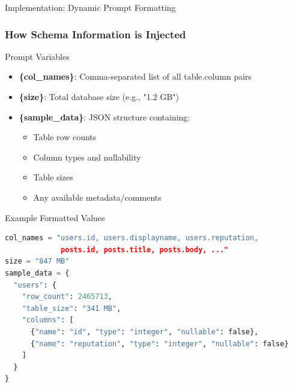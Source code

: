 \documentclass{beamer}
\begin{document}
\begin{frame}[fragile]{Implementation: Dynamic Prompt Formatting}
\frametitle{How Schema Information is Injected}

\begin{block}{Prompt Variables}
\begin{itemize}
    \item \textbf{\{col\_names\}}: Comma-separated list of all table.column pairs
    \item \textbf{\{size\}}: Total database size (e.g., "1.2 GB")
    \item \textbf{\{sample\_data\}}: JSON structure containing:
    \begin{itemize}
        \item Table row counts
        \item Column types and nullability
        \item Table sizes
        \item Any available metadata/comments
    \end{itemize}
\end{itemize}
\end{block}

\begin{exampleblock}{Example Formatted Values}
\begin{lstlisting}[language=Python, basicstyle=\tiny\ttfamily]
col_names = "users.id, users.displayname, users.reputation, 
             posts.id, posts.title, posts.body, ..."
size = "847 MB"
sample_data = {
  "users": {
    "row_count": 2465713,
    "table_size": "341 MB",
    "columns": [
      {"name": "id", "type": "integer", "nullable": false},
      {"name": "reputation", "type": "integer", "nullable": false}
    ]
  }
}
\end{lstlisting}
\end{exampleblock}

\end{frame}
\end{document}
